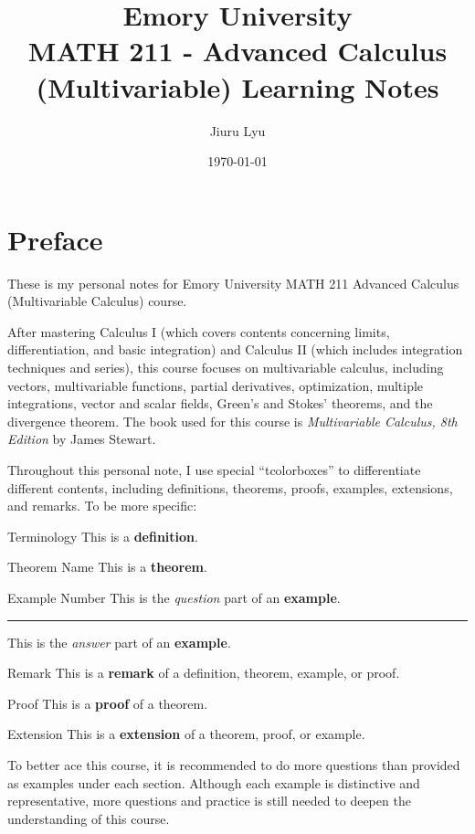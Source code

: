 \documentclass[12pt,a4paper]{article}
\title{Emory University\\\textbf{MATH 211 - Advanced Calculus (Multivariable) Learning Notes}}
\author{Jiuru Lyu}
\date{\today}
\begin{document}
\maketitle
\tableofcontents
\newpage

\section*{Preface}
These is my personal notes for Emory University MATH 211 Advanced Calculus (Multivariable Calculus) course. 

After mastering Calculus I (which covers contents concerning limits, differentiation, and basic integration) and Calculus II (which includes integration techniques and series), this course focuses on multivariable calculus, including vectors, multivariable functions, partial derivatives, optimization, multiple integrations, vector and scalar fields, Green’s and Stokes’ theorems, and the divergence theorem. The book used for this course is \textit{Multivariable Calculus, 8th Edition} by James Stewart. 

Throughout this personal note, I use special ``tcolorboxes'' to differentiate different contents, including definitions, theorems, proofs, examples, extensions, and remarks. To be more specific: 
\begin{df}{Terminology}
	This is a \textbf{definition}.	
\end{df}
\begin{thm}{Theorem Name}
	This is a \textbf{theorem}.	
\end{thm}
\begin{eg}{Example Number}
	This is the \textit{question} part of an \textbf{example}. \\
	\noindent\rule[0.25\baselineskip]{\textwidth}{1pt}
	This is the \textit{answer} part of an \textbf{example}. 
\end{eg}
\begin{rmk}{Remark}
	This is a \textbf{remark} of a definition, theorem, example, or proof. 
\end{rmk}
\begin{prf}{Proof}
	This is a \textbf{proof} of a theorem. 
\end{prf}
\begin{ext}{Extension}
	This is a \textbf{extension} of a theorem, proof, or example. 	
\end{ext}

To better ace this course, it is recommended to do more questions than provided as examples under each section. Although each example is distinctive and representative, more questions and practice is still needed to deepen the understanding of this course. 
\end{document}
